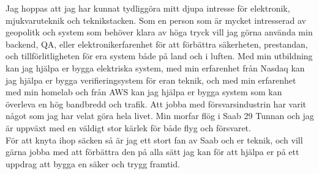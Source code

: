 \documentclass[../../main.tex]{subfiles}
\begin{document}
Jag hoppas att jag har kunnat tydliggöra mitt djupa intresse för elektronik, mjukvaruteknik och teknikstacken. Som en person som är mycket intresserad av geopolitk och system som behöver klara av höga tryck vill jag görna använda min backend, QA, eller elektronikerfarenhet för att förbättra säkerheten, prestandan, och tillförlitligheten för era system både på land och i luften. Med min utbildning kan jag hjälpa er bygga elektriska system, med min erfarenhet från Nasdaq kan jag hjälpa er bygga verifieringsystem för eran teknik, och med min erfarenhet med min homelab och från AWS kan jag hjälpa er bygga system som kan överleva en hög bandbredd och trafik. Att jobba med försvarsindustrin har varit något som jag har velat göra hela livet. Min morfar flög i Saab 29 Tunnan och jag är uppväxt med en väldigt stor kärlek för både flyg och försvaret.
\\
För att knyta ihop säcken så är jag ett stort fan av Saab och er teknik, och vill gärna jobba med att förbättra den på alla sätt jag kan för att hjälpa er på ett uppdrag att bygga en säker och trygg framtid.
\\
\end{document}

